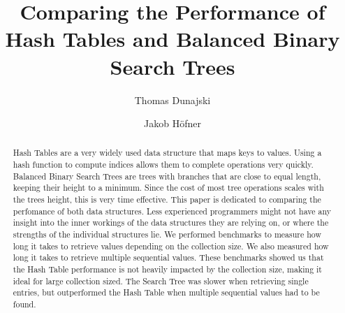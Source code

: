 \documentclass{llncs}
\begin{document}
%
\frontmatter %
%
\pagestyle{headings}  %
%
\mainmatter %
%
\title{Comparing the Performance of Hash Tables and Balanced Binary Search Trees}
%
%
\author{Thomas Dunajski \and Jakob Höfner}

%


\maketitle %

\begin{abstract}
Hash Tables are a very widely used data structure that maps keys to values. Using a hash function to compute indices allows them to complete operations very quickly. Balanced Binary Search Trees are trees with branches that are close to equal length, keeping their height to a minimum. Since the cost of most tree operations scales with the trees height, this is very time effective. This paper is dedicated to comparing the perfomance of both data structures. Less experienced programmers might not have any insight into the inner workings of the data structures they are relying on, or where the strengths of the individual structures lie. We performed benchmarks to measure how long it takes to retrieve values depending on the collection size. We also measured how long it takes to retrieve multiple sequential values. These benchmarks showed us that the Hash Table performance is not heavily impacted by the collection size, making it ideal for large collection sized.  The Search Tree was slower when retrieving single entries, but outperformed the Hash Table when multiple sequential values had to be found.
\end{abstract}

\tableofcontents
\newpage






\end{document}
